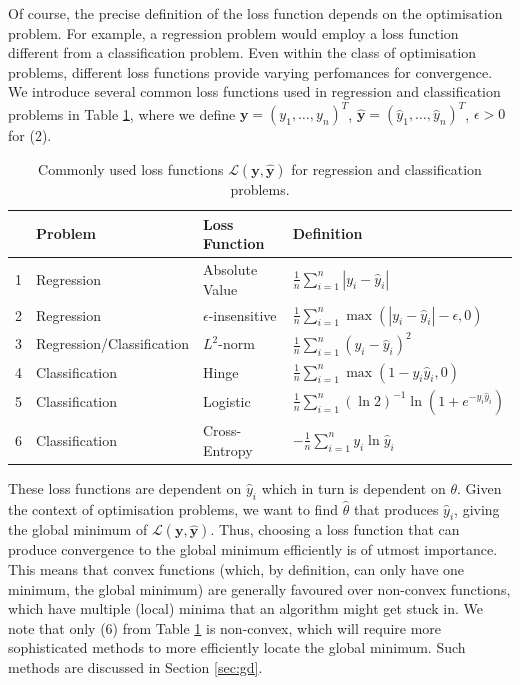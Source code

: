 \documentclass[a4paper,11pt,titlepage]{article}
\theoremstyle{definition}
\theoremstyle{plain}
\theoremstyle{remark}
\begin{document}
Of course, the precise definition of the loss function depends on the optimisation problem. For example, a regression problem would employ a loss function different from a classification problem. Even within the class of optimisation problems, different loss functions provide varying perfomances for convergence. We introduce several common loss functions used in regression and classification problems in Table \ref{tab:lfd}, where we define $\mathbf{y} = \left(y_1, \dots, y_n\right)^T$, $\mathbf{\hat{y}} = \left(\hat{y}_1, \dots, \hat{y}_n\right)^T$, $\epsilon > 0$ for (2).
\begin{table}[htbp]
    \centering
    \begin{tabular}{llll}
        \toprule
          & Problem  & Loss Function  &  Definition \\
        \midrule
        1 & Regression       & Absolute Value            & $\frac{1}{n}\sum_{i=1}^n |y_i - \hat{y}_i|$      \\
        2 &Regression       & $\epsilon$-insensitive   & $\frac{1}{n}\sum_{i=1}^n \max{(|y_i - \hat{y}_i| - \epsilon, 0)}$\\
        3 & Regression/Classification       & $L^2$-norm                   & $\frac{1}{n}\sum_{i=1}^n\left(y_i - \hat{y}_i\right)^2$        \\
        4 & Classification  & Hinge                     & $\frac{1}{n}\sum_{i=1}^n\max{(1-y_i\hat{y}_i, 0)}$ \\
        5 & Classification  & Logistic                  & $\frac{1}{n}\sum_{i=1}^n \left(\ln 2\right)^{-1}\ln(1 + e^{-y_i\hat{y}_i})$ \\
        6 & Classification  & Cross-Entropy             & $-\frac{1}{n} \sum_{i=1}^n y_i\ln \hat{y}_i$\\ 
        \bottomrule
    \end{tabular}
    \caption{Commonly used loss functions $\mathcal{L}(\mathbf{y}, \mathbf{\hat{y}})$ for regression and classification problems.}
    \label{tab:lfd}
\end{table}

These loss functions are dependent on $\hat{y}_i$ which in turn is dependent on $\theta$. Given the context of optimisation problems, we want to find $\hat{\theta}$ that produces $\hat{y}_i$, giving the global minimum of $\mathcal{L}(\mathbf{y}, \mathbf{\hat{y}})$. Thus, choosing a loss function that can produce convergence to the global minimum efficiently is of utmost importance. This means that convex functions (which, by definition, can only have one minimum, the global minimum) are generally favoured over non-convex functions, which have multiple (local) minima that an algorithm might get stuck in. We note that only (6) from Table \ref{tab:lfd} is non-convex, which will require more sophisticated methods to more efficiently locate the global minimum. Such methods are discussed in Section \ref{sec:gd}.
\end{document}
